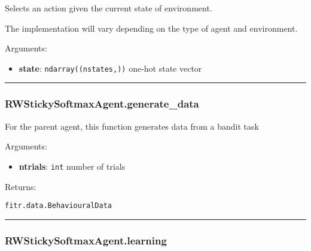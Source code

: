 \begin{Shaded}
\begin{Highlighting}[]
\end{Highlighting}
\end{Shaded}

Selects an action given the current state of environment.

The implementation will vary depending on the type of agent and
environment.

Arguments:

\begin{itemize}
\tightlist
\item
  \textbf{state}: \texttt{ndarray((nstates,))} one-hot state vector
\end{itemize}

\begin{center}\rule{0.5\linewidth}{\linethickness}\end{center}

\subsubsection{RWStickySoftmaxAgent.generate\_data}\label{rwstickysoftmaxagent.generate_data}

\begin{Shaded}
\begin{Highlighting}[]
\end{Highlighting}
\end{Shaded}

For the parent agent, this function generates data from a bandit task

Arguments:

\begin{itemize}
\tightlist
\item
  \textbf{ntrials}: \texttt{int} number of trials
\end{itemize}

Returns:

\texttt{fitr.data.BehaviouralData}

\begin{center}\rule{0.5\linewidth}{\linethickness}\end{center}

\subsubsection{RWStickySoftmaxAgent.learning}\label{rwstickysoftmaxagent.learning}

